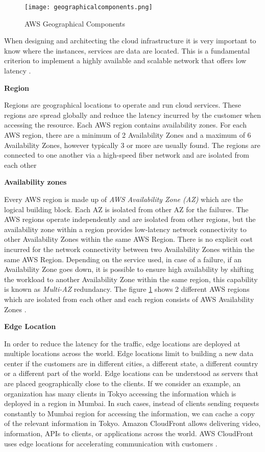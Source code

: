 \begin{figure}
    \centering
    \texttt{[image: geographicalcomponents.png]}
    \caption{AWS Geographical Components}{\cite{16}}
    \label{fig:identities}
\end{figure}

\par When designing and architecting the cloud infrastructure it is very important to know where the instances, services are data are located.
This is a fundamental criterion to implement a highly
available and scalable network that offers low latency
\cite{20}.


\textbf{Region}
\par Regions are geographical locations to operate and run cloud services.
These regions are spread globally and reduce the latency incurred by the customer when accessing the resource.
Each AWS region contains availability zones.
For each AWS region, there are a minimum of 2 Availability
Zones and a
maximum of 6 Availability Zones, however typically 3 or more are usually found.
The regions are connected to one another via a high-speed
fiber network and are isolated from each other \cite{21}


\textbf{Availability zones}
\par Every AWS region is made up of \textit{AWS Availability Zone (AZ)} which are the logical building block. Each AZ is isolated from other AZ for the failures.
The AWS regions operate independently and are isolated from other regions, but the availability zone within a region provides low-latency network connectivity to other Availability Zones within the same AWS Region.
There is no explicit cost incurred for the network connectivity between two Availability Zones within the same AWS Region.
Depending on the service used, in case of a failure, if an Availability Zone goes down, it is possible to ensure high availability by shifting the workload to another Availability Zone within the same region, this capability is known as \textit{Multi-AZ} redundancy.
The figure \ref{fig:identities} shows 2 different AWS
regions which are isolated from each other and each region consists of AWS Availability Zones \cite{22}.

\textbf{Edge Location}
\par In order to reduce the latency for the traffic, edge locations are deployed at multiple locations across the
world. Edge locations limit to building a new data center
if the customers are in different cities, a different
state, a different
country or a different
part of the world. Edge locations can be understood as servers that are placed geographically close to the clients.
If we consider an example, an organization has many clients in Tokyo accessing the information which is deployed in a
region in Mumbai. In such cases, instead of clients sending requests constantly to Mumbai region for accessing the
information, we can cache a copy of the relevant information in Tokyo. Amazon CloudFront allows delivering video,
information, APIs to clients, or applications across the world. AWS CloudFront uses edge locations for accelerating
communication with customers \cite{23}.

